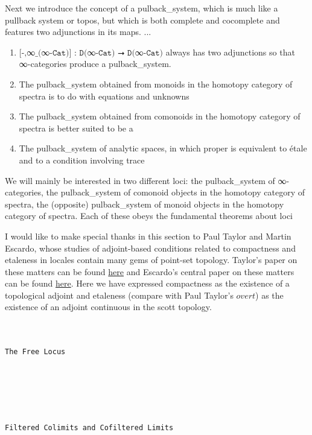 \documentclass{book}
\theoremstyle{definition}
\renewcommand{\chapter}[1]{
\newpage
{
\Huge 
\begin{center}
\ \\
\ \\
\thispagestyle{empty}
\texttt{#1}
\end{center}}
\ \\
\ \\
}
\begin{document}
{{Next we introduce the concept of a pulback_system, which is much like a pullback system or topos, but which is both complete and cocomplete and features two adjunctions in its maps. ... 

\begin{enumerate}
\item $\texttt{[-,}$∞$\texttt{\_(}$∞$\texttt{-Cat)] : D(}$∞$\texttt{-Cat) ⭢ D(}$∞$\texttt{-Cat)}$ always has two adjunctions so that ∞-categories produce a pulback_system.
\item The pulback_system obtained from monoids in the homotopy category of spectra is to do with equations and unknowns
\item The pulback_system obtained from comonoids in the homotopy category of spectra is better suited to be a 
\item The pulback_system of analytic spaces, in which proper is equivalent to étale and to a condition involving trace
\end{enumerate} We will mainly be interested in two different loci: the pulback_system of ∞-categories, the pulback_system of comonoid objects in the homotopy category of spectra, the (opposite) pulback_system of monoid objects in the homotopy category of spectra. Each of these obeys the fundamental theorems about loci 

I would like to make special thanks in this section to Paul Taylor and Martin Escardo, whose studies of adjoint-based conditions related to compactness and etaleness in locales contain many gems of point-set topology. Taylor's paper on these matters can be found \href{https://paultaylor.eu/ASD/foufct/foufct.pdf}{here} and Escardo's central paper on these matters can be found \href{https://www.cs.bham.ac.uk/~mhe/papers/barbados.pdf}{here}. Here we have expressed compactness as the existence of a topological adjoint and etaleness (compare with Paul Taylor's $\textit{overt}$) as the existence of an adjoint continuous in the scott topology. 



\chapter{The Free Locus}



\chapter{Filtered Colimits and Cofiltered Limits}

}}
\end{document}
